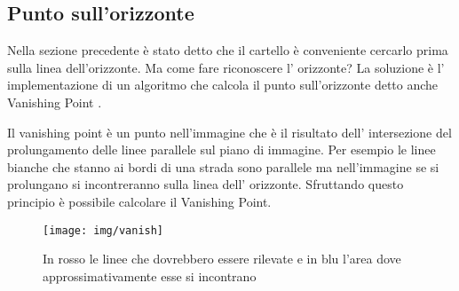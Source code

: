 	\subsection{Punto sull'orizzonte}

		Nella sezione precedente è stato detto che il cartello è conveniente cercarlo prima sulla linea dell'orizzonte. Ma come fare riconoscere l' orizzonte? La soluzione è l' implementazione di un algoritmo che calcola il punto sull'orizzonte detto anche Vanishing Point \cite{vanish}.
		
		Il vanishing point è un punto nell'immagine che è il risultato  dell' intersezione del prolungamento delle linee parallele sul piano di immagine. Per esempio le linee bianche che stanno ai bordi di una strada sono parallele ma nell'immagine se si prolungano si incontreranno sulla linea dell' orizzonte. Sfruttando questo principio è possibile calcolare il Vanishing Point.
		\begin{figure}[!ht]
			\centering
			\texttt{[image: img/vanish]}
			\caption[Punto sull'orizzonte]{In rosso le linee che dovrebbero essere rilevate e in blu l'area dove approssimativamente esse si incontrano}
		\end{figure}

